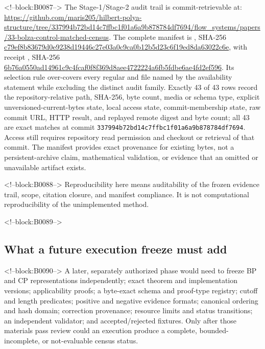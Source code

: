 \documentclass[11pt,a4paper]{article}
\begin{document}
<!--block:B0087-->
The Stage-1/Stage-2 audit trail is commit-retrievable at:\newline
\url{https://github.com/maris205/hilbert-polya-structure/tree/337994b72bd14c7ffbc1f01a6a9b878784df7694/flow_systems/papers/33-bolza-control-matched-census}.
The complete manifest is , SHA-256 \url{c79ef8b83679d0e9238d19446c27e03a0c9ca0b12b5d23c6f19ed8da63022c6e}, with receipt , SHA-256 \url{6b76a0550ad14961c9c4fcaf0f8f369d8aee4722224a6fb5fdbe6ae4fd2ef596}. Its selection rule over-covers every regular  and  file named by the availability statement while excluding the distinct  audit family. Exactly 43 of 43 rows record the repository-relative path, SHA-256, byte count, media or schema type, explicit unversioned-current-bytes state, local access state, commit-membership state, raw commit URL, HTTP result, and replayed remote digest and byte count; all 43 are exact matches at commit \texttt{337994b72bd14c7ffbc1f01a6a9b878784df7694}. Access still requires repository read permission and checkout or retrieval of that commit. The manifest provides exact provenance for existing bytes, not a persistent-archive claim, mathematical validation, or evidence that an omitted or unavailable artifact exists.

<!--block:B0088-->
Reproducibility here means auditability of the frozen evidence trail, scope, citation closure, and manifest compliance. It is not computational reproducibility of the unimplemented method.

<!--block:B0089-->
\hypertarget{what-a-future-execution-freeze-must-add}{%
\subsection{What a future execution freeze must add}\label{what-a-future-execution-freeze-must-add}}

<!--block:B0090-->
A later, separately authorized phase would need to freeze BP and CP representations independently; exact theorem and implementation versions; applicability proofs; a byte-exact schema and proof-type registry; cutoff and length predicates; positive and negative evidence formats; canonical ordering and hash domain; correction provenance; resource limits and status transitions; an independent validator; and accepted/rejected fixtures. Only after those materials pass review could an execution produce a complete, bounded-incomplete, or not-evaluable census status.
\end{document}
